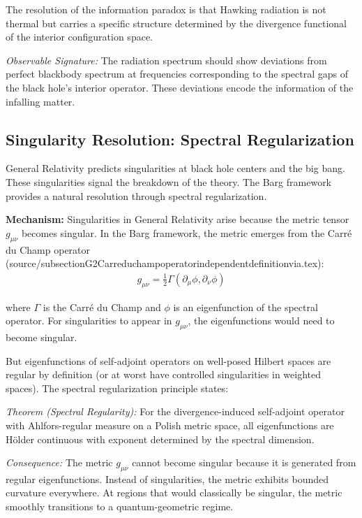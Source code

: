 \documentclass[12pt,a4paper]{article}
\begin{document}
The resolution of the information paradox is that Hawking radiation is not thermal but carries a specific structure determined by the divergence functional of the interior configuration space.

\textit{Observable Signature:} The radiation spectrum should show deviations from perfect blackbody spectrum at frequencies corresponding to the spectral gaps of the black hole's interior operator. These deviations encode the information of the infalling matter.

\subsection{Singularity Resolution: Spectral Regularization}

General Relativity predicts singularities at black hole centers and the big bang. These singularities signal the breakdown of the theory. The Barg framework provides a natural resolution through spectral regularization.

\textbf{Mechanism:} Singularities in General Relativity arise because the metric tensor $g_{\mu\nu}$ becomes singular. In the Barg framework, the metric emerges from the Carré du Champ operator (source/subsectionG2Carreduchampoperatorindependentdefinitionvia.tex):
\begin{align}
g_{\mu\nu} = \frac{1}{2}\Gamma(\partial_\mu\phi, \partial_\nu\phi)
\end{align}

where $\Gamma$ is the Carré du Champ and $\phi$ is an eigenfunction of the spectral operator. For singularities to appear in $g_{\mu\nu}$, the eigenfunctions would need to become singular.

But eigenfunctions of self-adjoint operators on well-posed Hilbert spaces are regular by definition (or at worst have controlled singularities in weighted spaces). The spectral regularization principle states:

\textit{Theorem (Spectral Regularity):} For the divergence-induced self-adjoint operator with Ahlfors-regular measure on a Polish metric space, all eigenfunctions are Hölder continuous with exponent determined by the spectral dimension.

\textit{Consequence:} The metric $g_{\mu\nu}$ cannot become singular because it is generated from regular eigenfunctions. Instead of singularities, the metric exhibits bounded curvature everywhere. At regions that would classically be singular, the metric smoothly transitions to a quantum-geometric regime.
\end{document}

